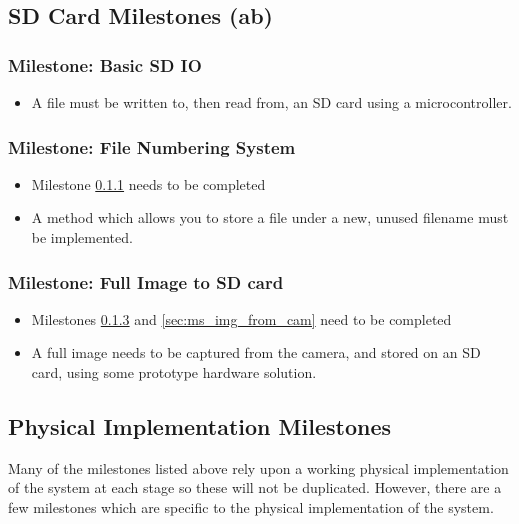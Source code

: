 \subsection{SD Card Milestones (ab)}

\subsubsection{Milestone: Basic SD IO}
		\label{sec:ms_sd_io}
		\begin{itemize}
			\item  A file must be written to, then read from, an SD card using a microcontroller.
		\end{itemize}

\subsubsection{Milestone: File Numbering System}
		\label{sec:ms_sd_file_num}
		\begin{itemize}
			\item Milestone \ref{sec:ms_sd_io} needs to be completed
			\item A method which allows you to store a file under a new, unused filename must be implemented.
		\end{itemize}

\subsubsection{Milestone: Full Image to SD card}
		\label{sec:ms_sd_full_img}
		\begin{itemize}
			\item Milestones \ref{sec:ms_sd_full_img} and \ref{sec:ms_img_from_cam} need to be completed
			\item A full image needs to be captured from the camera, and stored on an SD card, using some prototype hardware solution.
		\end{itemize}


\subsection{Physical Implementation Milestones}
Many of the milestones listed above rely upon a working physical implementation of the system at each stage
so these will not be duplicated. However, there are a few milestones which are specific to the physical implementation
of the system.

